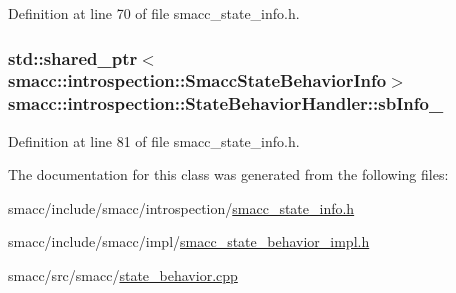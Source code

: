 Definition at line 70 of file smacc\+\_\+state\+\_\+info.\+h.

\subsubsection[{\texorpdfstring{sb\+Info\+\_\+}{sbInfo_}}]{\setlength{\rightskip}{0pt plus 5cm}std\+::shared\+\_\+ptr$<${\bf smacc\+::introspection\+::\+Smacc\+State\+Behavior\+Info}$>$ smacc\+::introspection\+::\+State\+Behavior\+Handler\+::sb\+Info\+\_\+}\hypertarget{classsmacc_1_1introspection_1_1StateBehaviorHandler_abe31b6493db5b73d85707b4a68ec0f51}{}\label{classsmacc_1_1introspection_1_1StateBehaviorHandler_abe31b6493db5b73d85707b4a68ec0f51}


Definition at line 81 of file smacc\+\_\+state\+\_\+info.\+h.



The documentation for this class was generated from the following files\+:\begin{DoxyCompactItemize}
\item 
smacc/include/smacc/introspection/\hyperlink{smacc__state__info_8h}{smacc\+\_\+state\+\_\+info.\+h}\item 
smacc/include/smacc/impl/\hyperlink{smacc__state__behavior__impl_8h}{smacc\+\_\+state\+\_\+behavior\+\_\+impl.\+h}\item 
smacc/src/smacc/\hyperlink{state__behavior_8cpp}{state\+\_\+behavior.\+cpp}\end{DoxyCompactItemize}
